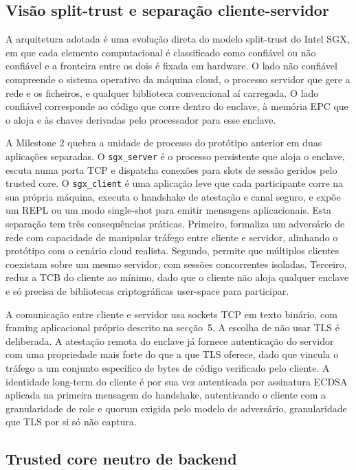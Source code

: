 \subsection{Visão split-trust e separação cliente-servidor}

A arquitetura adotada é uma evolução direta do modelo split-trust do Intel SGX, em que cada elemento computacional é classificado como confiável ou não confiável e a fronteira entre os dois é fixada em hardware. O lado não confiável compreende o sistema operativo da máquina cloud, o processo servidor que gere a rede e os ficheiros, e qualquer biblioteca convencional aí carregada. O lado confiável corresponde ao código que corre dentro do enclave, à memória EPC que o aloja e às chaves derivadas pelo processador para esse enclave.

A Milestone 2 quebra a unidade de processo do protótipo anterior em duas aplicações separadas. O \texttt{sgx\_server} é o processo persistente que aloja o enclave, escuta numa porta TCP e dispatcha conexões para slots de sessão geridos pelo trusted core. O \texttt{sgx\_client} é uma aplicação leve que cada participante corre na sua própria máquina, executa o handshake de atestação e canal seguro, e expõe um REPL ou um modo single-shot para emitir mensagens aplicacionais. Esta separação tem três consequências práticas. Primeiro, formaliza um adversário de rede com capacidade de manipular tráfego entre cliente e servidor, alinhando o protótipo com o cenário cloud realista. Segundo, permite que múltiplos clientes coexistam sobre um mesmo servidor, com sessões concorrentes isoladas. Terceiro, reduz a TCB do cliente ao mínimo, dado que o cliente não aloja qualquer enclave e só precisa de bibliotecas criptográficas user-space para participar.

A comunicação entre cliente e servidor usa sockets TCP em texto binário, com framing aplicacional próprio descrito na secção~5. A escolha de não usar TLS é deliberada. A atestação remota do enclave já fornece autenticação do servidor com uma propriedade mais forte do que a que TLS oferece, dado que vincula o tráfego a um conjunto específico de bytes de código verificado pelo cliente. A identidade long-term do cliente é por sua vez autenticada por assinatura ECDSA aplicada na primeira mensagem do handshake, autenticando o cliente com a granularidade de role e quorum exigida pelo modelo de adversário, granularidade que TLS por si só não captura.

\subsection{Trusted core neutro de backend}

